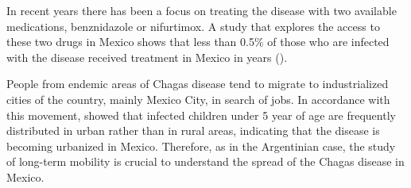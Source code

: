 In recent years there has been a focus on treating the disease with two available
medications, benznidazole or nifurtimox. A study
that explores the access to these two drugs in Mexico
shows that less than 0.5\% of those who are infected with
the disease received treatment in Mexico in years (\cite{manne2013barriers}).


People from endemic areas of Chagas disease tend to migrate to industrialized cities of the country, mainly Mexico City, in search of jobs.
In accordance with this movement, \cite{guzman2001epidemiology} showed
that infected children under 5 year of age are frequently distributed in urban
rather than in rural areas, indicating that the disease is becoming urbanized in
Mexico.
Therefore, as in the Argentinian case, the study of long-term mobility is crucial to understand the spread of the Chagas disease in Mexico.






